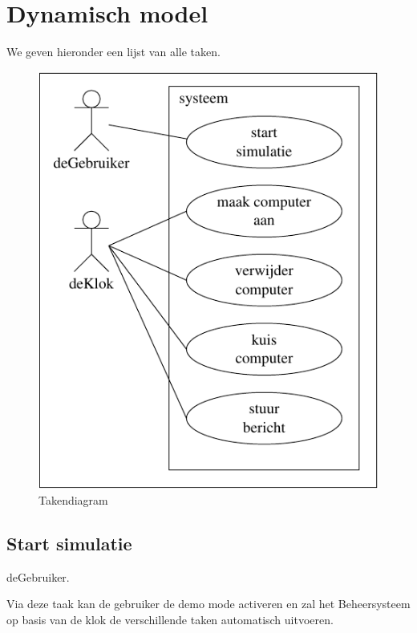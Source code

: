 \documentclass[a4paper,oneside]{report}
\begin{document}
\section{Dynamisch model}
We geven hieronder een lijst van alle taken.

\begin{figure}[h!]
\begin{center}
\includegraphics{taken_diagram2}
\caption{Takendiagram}
\end{center}
\end{figure}

\newpage

\subsection{Start simulatie}
deGebruiker.

Via deze taak kan de gebruiker de demo mode activeren en zal het Beheersysteem op basis van de klok de verschillende taken automatisch uitvoeren.
\end{document}
